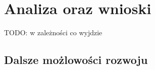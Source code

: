 \chapter{Analiza oraz wnioski}

TODO: w zależności co wyjdzie

\section{Dalsze możlowości rozwoju}


